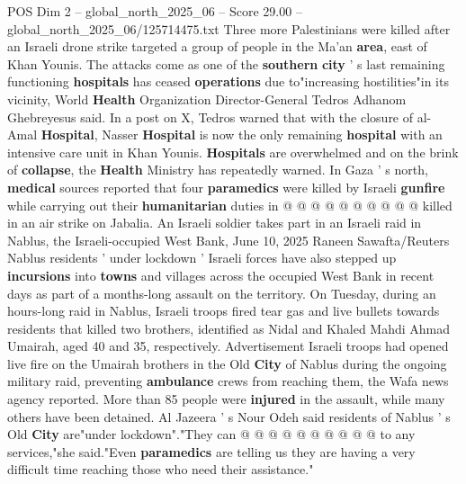 \begin{textsample}{POS Dim 2 – global\_north\_2025\_06 – Score 29.00 – global\_north\_2025\_06/125714475.txt}
Three more Palestinians were killed after an Israeli drone strike targeted a group of people in the Ma'an \textbf{area}, east of Khan Younis.
The attacks come as one of the \textbf{southern} \textbf{city} ' s last remaining functioning \textbf{hospitals} has ceased \textbf{operations} due to"increasing hostilities"in its vicinity, World \textbf{Health} Organization Director-General Tedros Adhanom Ghebreyesus said.
In a post on X, Tedros warned that with the closure of al-Amal \textbf{Hospital}, Nasser \textbf{Hospital} is now the only remaining \textbf{hospital} with an intensive care unit in Khan Younis. \textbf{Hospitals} are overwhelmed and on the brink of \textbf{collapse}, the \textbf{Health} Ministry has repeatedly warned.
In Gaza ' s north, \textbf{medical} sources reported that four \textbf{paramedics} were killed by Israeli \textbf{gunfire} while carrying out their \textbf{humanitarian} duties in @ @ @ @ @ @ @ @ @ @ killed in an air strike on Jabalia.
An Israeli soldier takes part in an Israeli raid in Nablus, the Israeli-occupied West Bank, June 10, 2025 Raneen Sawafta/Reuters Nablus residents ' under lockdown ' Israeli forces have also stepped up \textbf{incursions} into \textbf{towns} and villages across the occupied West Bank in recent days as part of a months-long assault on the territory.
On Tuesday, during an hours-long raid in Nablus, Israeli troops fired tear gas and live bullets towards residents that killed two brothers, identified as Nidal and Khaled Mahdi Ahmad Umairah, aged 40 and 35, respectively.
Advertisement Israeli troops had opened live fire on the Umairah brothers in the Old \textbf{City} of Nablus during the ongoing military raid, preventing \textbf{ambulance} crews from reaching them, the Wafa news agency reported.
More than 85 people were \textbf{injured} in the assault, while many others have been detained.
Al Jazeera ' s Nour Odeh said residents of Nablus ' s Old \textbf{City} are"under lockdown"."They can @ @ @ @ @ @ @ @ @ @ to any services,"she said."Even \textbf{paramedics} are telling us they are having a very difficult time reaching those who need their assistance."

\end{textsample}
